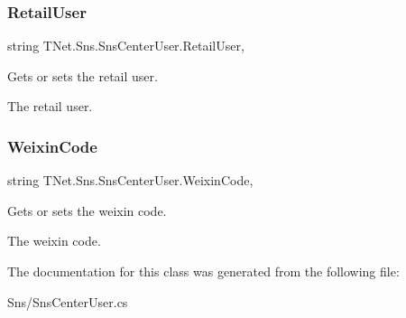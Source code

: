 \subsubsection{\texorpdfstring{Retail\+User}{RetailUser}}
{\footnotesize\ttfamily string T\+Net.\+Sns.\+Sns\+Center\+User.\+Retail\+User\hspace{0.3cm}{\ttfamily [get]}, {\ttfamily [set]}}



Gets or sets the retail user. 

The retail user.\mbox{\label{class_t_net_1_1_sns_1_1_sns_center_user_af63ab8e0d91da916bd8586abe8779cdd}} 
\subsubsection{\texorpdfstring{Weixin\+Code}{WeixinCode}}
{\footnotesize\ttfamily string T\+Net.\+Sns.\+Sns\+Center\+User.\+Weixin\+Code\hspace{0.3cm}{\ttfamily [get]}, {\ttfamily [set]}}



Gets or sets the weixin code. 

The weixin code.

The documentation for this class was generated from the following file\+:\begin{DoxyCompactItemize}
\item 
Sns/Sns\+Center\+User.\+cs\end{DoxyCompactItemize}
